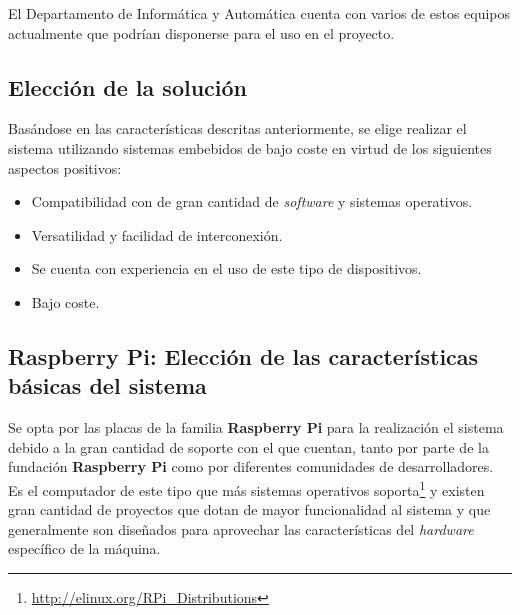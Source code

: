 El Departamento de Informática y Automática cuenta con varios de estos equipos actualmente que podrían disponerse para el uso en el proyecto.

\subsection{Elección de la solución}

Basándose en las características descritas anteriormente, se elige realizar el sistema utilizando sistemas embebidos de bajo coste en virtud de los siguientes aspectos positivos:

\begin{itemize}
\item Compatibilidad con de gran cantidad de \textit{software} y sistemas operativos.
\item Versatilidad y facilidad de interconexión.
\item Se cuenta con experiencia en el uso de este tipo de dispositivos.
\item Bajo coste.
\end{itemize}


\subsection{Raspberry Pi: Elección de las características básicas del sistema}

Se opta por las placas de la familia \textbf{Raspberry Pi} para la realización el sistema debido a la gran cantidad de soporte con el que cuentan, tanto por parte de la fundación \textbf{Raspberry Pi} como por diferentes comunidades de desarrolladores. Es el computador de este tipo que más sistemas operativos soporta\footnote{\href{http://elinux.org/RPi_Distributions}{http://elinux.org/RPi\_Distributions}} y existen gran cantidad de proyectos que dotan de mayor funcionalidad al sistema y que generalmente son diseñados para aprovechar las características del \textit{hardware} específico de la máquina.

